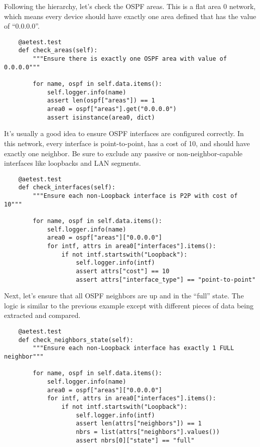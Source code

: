 Following the hierarchy, let's check the OSPF areas. This is a flat area 0
network, which means every device should have exactly one area defined that
has the value of ``0.0.0.0''.

\begin{verbatim}
    @aetest.test
    def check_areas(self):
        """Ensure there is exactly one OSPF area with value of 0.0.0.0"""

        for name, ospf in self.data.items():
            self.logger.info(name)
            assert len(ospf["areas"]) == 1
            area0 = ospf["areas"].get("0.0.0.0")
            assert isinstance(area0, dict)
\end{verbatim}

It's usually a good idea to ensure OSPF interfaces are configured correctly.
In this network, every interface is point-to-point, has a cost of 10, and
should have exactly one neighbor. Be sure to exclude any passive or
non-neighbor-capable interfaces like loopbacks and LAN segments.

\begin{verbatim}
    @aetest.test
    def check_interfaces(self):
        """Ensure each non-Loopback interface is P2P with cost of 10"""

        for name, ospf in self.data.items():
            self.logger.info(name)
            area0 = ospf["areas"]["0.0.0.0"]
            for intf, attrs in area0["interfaces"].items():
                if not intf.startswith("Loopback"):
                    self.logger.info(intf)
                    assert attrs["cost"] == 10
                    assert attrs["interface_type"] == "point-to-point"
\end{verbatim}

Next, let's ensure that all OSPF neighbors are up and in the ``full'' state.
The logic is similar to the previous example except with different pieces of
data being extracted and compared.

\begin{verbatim}
    @aetest.test
    def check_neighbors_state(self):
        """Ensure each non-Loopback interface has exactly 1 FULL neighbor"""

        for name, ospf in self.data.items():
            self.logger.info(name)
            area0 = ospf["areas"]["0.0.0.0"]
            for intf, attrs in area0["interfaces"].items():
                if not intf.startswith("Loopback"):
                    self.logger.info(intf)
                    assert len(attrs["neighbors"]) == 1
                    nbrs = list(attrs["neighbors"].values())
                    assert nbrs[0]["state"] == "full"
\end{verbatim}

